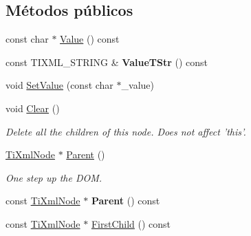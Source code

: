 \subsection*{Métodos públicos}
\begin{DoxyCompactItemize}
\item 
const char $\ast$ \hyperlink{class_ti_xml_node_a77943eb90d12c2892b1337a9f5918b41}{Value} () const 
\item 
\hypertarget{class_ti_xml_node_a83ece13d2ea66dac66e0b21332229239}{const T\-I\-X\-M\-L\-\_\-\-S\-T\-R\-I\-N\-G \& {\bfseries Value\-T\-Str} () const }\label{class_ti_xml_node_a83ece13d2ea66dac66e0b21332229239}

\item 
void \hyperlink{class_ti_xml_node_a2a38329ca5d3f28f98ce932b8299ae90}{Set\-Value} (const char $\ast$\-\_\-value)
\item 
\hypertarget{class_ti_xml_node_a708e7f953df61d4d2d12f73171550a4b}{void \hyperlink{class_ti_xml_node_a708e7f953df61d4d2d12f73171550a4b}{Clear} ()}\label{class_ti_xml_node_a708e7f953df61d4d2d12f73171550a4b}

\begin{DoxyCompactList}\small\item\em Delete all the children of this node. Does not affect 'this'. \end{DoxyCompactList}\item 
\hypertarget{class_ti_xml_node_ab643043132ffd794f8602685d34a982e}{\hyperlink{class_ti_xml_node}{Ti\-Xml\-Node} $\ast$ \hyperlink{class_ti_xml_node_ab643043132ffd794f8602685d34a982e}{Parent} ()}\label{class_ti_xml_node_ab643043132ffd794f8602685d34a982e}

\begin{DoxyCompactList}\small\item\em One step up the D\-O\-M. \end{DoxyCompactList}\item 
\hypertarget{class_ti_xml_node_a78878709e53066f06eb4fcbcdd3a5260}{const \hyperlink{class_ti_xml_node}{Ti\-Xml\-Node} $\ast$ {\bfseries Parent} () const }\label{class_ti_xml_node_a78878709e53066f06eb4fcbcdd3a5260}

\item 
\hypertarget{class_ti_xml_node_a44c8eee26bbe2d1b2762038df9dde2f0}{const \hyperlink{class_ti_xml_node}{Ti\-Xml\-Node} $\ast$ \hyperlink{class_ti_xml_node_a44c8eee26bbe2d1b2762038df9dde2f0}{First\-Child} () const }\label{class_ti_xml_node_a44c8eee26bbe2d1b2762038df9dde2f0}


\end{DoxyCompactItemize}
